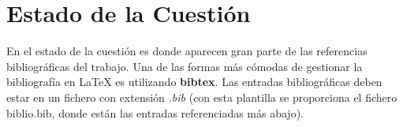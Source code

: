 \chapter{Estado de la Cuestión}
\label{cap:estadoDeLaCuestion}

En el estado de la cuestión es donde aparecen gran parte de las referencias bibliográficas del trabajo. Una de las formas más cómodas de gestionar la bibliografía en {\LaTeX} es utilizando \textbf{bibtex}. Las entradas bibliográficas deben estar en un fichero con extensión \textit{.bib} (con esta plantilla se proporciona el fichero biblio.bib, donde están las entradas referenciadas más abajo).





